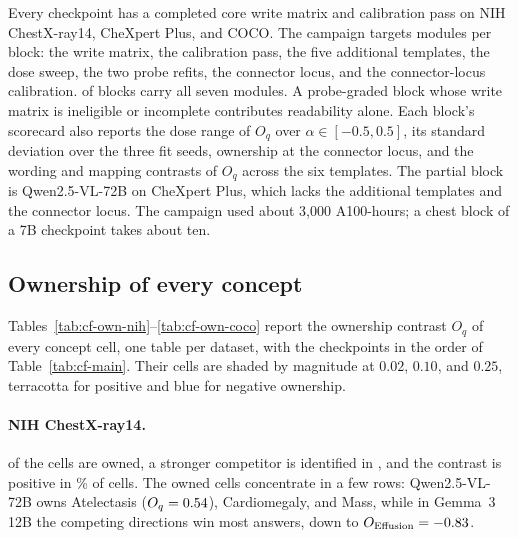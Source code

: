 \documentclass{article}
\begin{document}
Every checkpoint has a completed core write matrix and calibration pass on NIH ChestX-ray14, CheXpert Plus, and COCO. The campaign targets \cfCoveragePlannedWord{} modules per block: the write matrix, the calibration pass, the five additional templates, the dose sweep, the two probe refits, the connector locus, and the connector-locus calibration. \cfCoverageBlocksAllSeven{} of \cfBlocks{} blocks carry all seven modules. A probe-graded block whose write matrix is ineligible or incomplete contributes readability alone. Each block's scorecard also reports the dose range of $O_q$ over $\alpha\in[-0.5,0.5]$, its standard deviation over the three fit seeds, ownership at the connector locus, and the wording and mapping contrasts of $O_q$ across the six templates. The partial block is Qwen2.5-VL-72B on CheXpert Plus, which lacks the additional templates and the connector locus. The campaign used about 3,000 A100-hours; a chest block of a 7B checkpoint takes about ten.


\subsection{Ownership of every concept}
\label{app:cf-tables}

Tables~\ref{tab:cf-own-nih}--\ref{tab:cf-own-coco} report the ownership contrast $O_q$ of every concept cell, one table per dataset, with the checkpoints in the order of Table~\ref{tab:cf-main}. Their cells are shaded by magnitude at $0.02$, $0.10$, and $0.25$, terracotta for positive and blue for negative ownership.

\paragraph{NIH ChestX-ray14.} \cfNihOwned{} of the \cfNihCells{} cells are owned, a stronger competitor is identified in \cfNihCompetitor{}, and the contrast is positive in \cfGeoOwnWinsNihPct\% of cells. The owned cells concentrate in a few rows: Qwen2.5-VL-72B owns Atelectasis ($O_q=0.54$), Cardiomegaly, and Mass, while in Gemma~3 12B the competing directions win most answers, down to $O_{\mathrm{Effusion}}=-0.83$.
\end{document}
